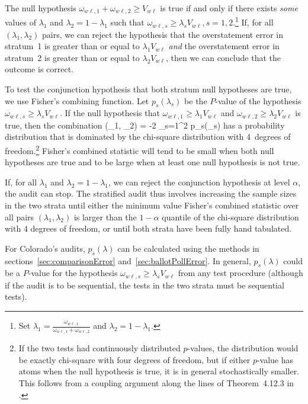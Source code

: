 The null hypothesis $\omega_{w\ell, 1} + \omega_{w\ell, 2} \ge V_{w\ell}$ is true if and only if there exists \textit{some}
values of $\lambda_1$ and $\lambda_2 = 1-\lambda_1$ such that $\omega_{w\ell, s}\ge \lambda_s V_{w\ell}, s=1, 2$.\footnote{
Set $\lambda_1 = \frac{\omega_{w\ell, 1}}{\omega_{w\ell, 1}+\omega_{w\ell, 2}}$ and $\lambda_2 = 1-\lambda_1$.
}
If, for all $(\lambda_1, \lambda_2)$ pairs, we can reject the hypothesis that the 
overstatement error in stratum~1 is greater than or equal to $\lambda_1 V_{w\ell}$ \emph{and} 
the overstatement error in stratum~2 is greater than or equal to $\lambda_2 V_{w\ell}$, then
we can conclude that the outcome is correct.

To test the conjunction hypothesis that both stratum null hypotheses are true, we use 
Fisher's combining function.
Let $p_s(\lambda_s)$ be the $P$-value of the hypothesis $\omega_{w\ell,s} \ge \lambda_s V_{w\ell}$.
If the null hypothesis that $\omega_{w\ell,1} \ge \lambda_1 V_{w\ell}$ and 
$\omega_{w\ell,2} \ge \lambda_2 V_{w\ell}$ is true, then the combination
\beq
   \chi(\lambda_1, \lambda_2) = -2 \sum_{s=1}^2 \ln p_s(\lambda_s)
\eeq
has a probability distribution that is dominated by the chi-square distribution with 4~degrees
of freedom.\footnote{%
   If the two tests had continuously distributed $p$-values, the distribution would be exactly
   chi-square with four degrees of freedom, but if either $p$-value has atoms when
   the null hypothesis is true, it is in general stochastically smaller.
   This follows from a coupling argument along the lines of Theorem~4.12.3 in \cite{grimmett01}.
}
Fisher's combined statistic will tend to be small when both null hypotheses are true and to be large when
at least one null hypothesis is not true.

If, for all $\lambda_1$ and $\lambda_2 = 1- \lambda_1$, we can reject the conjunction
hypothesis at level $\alpha$, the audit can stop.
The stratified audit thus involves increasing the sample sizes in the two strata until 
either the minimum value Fisher's combined statistic over all pairs $(\lambda_1, \lambda_2)$ is larger than the $1-\alpha$ quantile of the chi-square
distribution with 4 degrees of freedom, or until both strata have been fully hand tabulated.

For Colorado's audits, $p_s(\lambda)$ can be calculated using the methods in 
sections~\ref{sec:comparisonError} and~\ref{sec:ballotPollError}.
In general, $p_s(\lambda)$ could be a $P$-value for the hypothesis
$\omega_{w\ell,s} \ge \lambda_s V_{w\ell}$ from any test procedure (although
if the audit is to be sequential, the tests in the two strata must be sequential tests). 